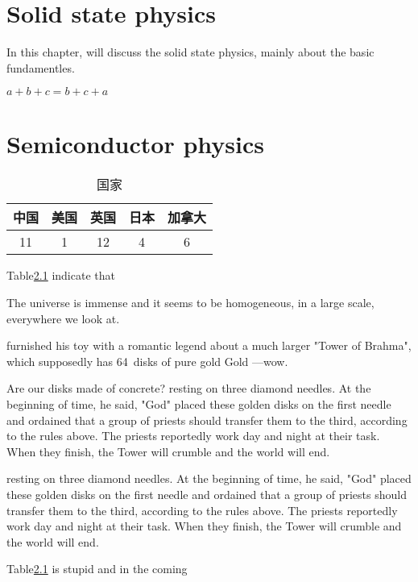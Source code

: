 \chapter{Solid state physics}
\label{Solid state physics}
In this chapter, will discuss the solid state physics, mainly about the basic fundamentles.

\begin{math}
	a + b + c = b + c + a
\end{math}

\begin{figure}

\end{figure}



\chapter{Semiconductor physics}
\label{Semiconductor physics}

	\begin{table}[H]
		\centering
		\caption{国家}
		\begin{tabular}{|c|c|c|c|c|}
			\hline
			中国 &美国 &英国 &日本&加拿大\\
			\hline
			11&1&12&4&6\\
			\hline
		\end{tabular}
		\label{tab2}    
	\end{table}
	
	Table\ref{tab2} indicate that
	
	The universe is immense and it seems to be homogeneous, 
	in a large scale, everywhere we look at.
	
	furnished his toy with a romantic legend about a much larger
	"Tower of Brahma", which supposedly has 64~disks of pure gold
	Gold ---wow.\par Are our disks made of concrete? 
	resting on three diamond needles. At the beginning of time, he said,
	"God" placed these golden disks on the first needle and ordained that a
	group of priests should transfer them to the third, according to the
	rules above. The priests reportedly work day and night at their task.
	When they finish, the Tower will crumble and the world will end.
	
	resting on three diamond needles. At the beginning of time, he said,
	"God" placed these golden disks on the first needle and ordained that a
	group of priests should transfer them to the third, according to the
	rules above. The priests reportedly work day and night at their task.
	When they finish, the Tower will crumble and the world will end.
	
	Table\ref{tab2} is stupid and in the coming
